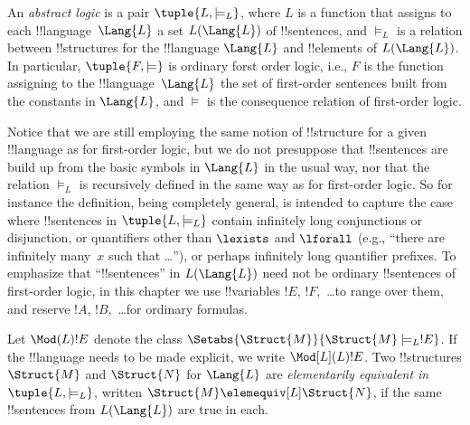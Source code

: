 \documentclass[../../include/open-logic-section]{subfiles}
\begin{document}

\begin{defn}
An \emph{abstract logic} is a pair $\tuple{L, \models_L}$, where $L$ is a
function that assigns to each !!{language}~$\Lang{L}$ a set
$L(\Lang{L})$ of !!{sentence}s, and $\models_L$ is a relation between
!!{structure}s for the !!{language} $\Lang{L}$ and !!{element}s of
$L(\Lang{L})$. In particular, $\tuple{F, \models}$ is ordinary forst
order logic, i.e., $F$ is the function assigning to the
!!{language}~$\Lang{L}$ the set of first-order sentences built from
the constants in $\Lang{L}$, and $\models$ is the consequence relation of
first-order logic.
\end{defn}

Notice that we are still employing the same notion of !!{structure}
for a given !!{language} as for first-order logic, but we do not
presuppose that !!{sentence}s are build up from the basic symbols in
$\Lang{L}$ in the usual way, nor that the relation $\models_L$ is
recursively defined in the same way as for first-order logic. So for
instance the definition, being completely general, is intended to
capture the case where !!{sentence}s in $\tuple{L,\models_L}$ contain
infinitely long conjunctions or disjunction, or quantifiers other than
$\lexists$ and $\lforall$ (e.g., ``there are infinitely many~$x$ such
that \dots''), or perhaps infinitely long quantifier prefixes. To
emphasize that ``!!{sentence}s'' in $L(\Lang{L})$ need not be ordinary
!!{sentence}s of first-order logic, in this chapter we use !!{variable}s $!E$,
$!F$,~\dots to range over them, and reserve $!A$, $!B$,~\dots for
ordinary formulas.

\begin{defn}
Let $\Mod(L){!E}$ denote the class $\Setabs{\Struct{M}}{\Struct{M}
  \models_L !E}$. If the !!{language} needs to be made explicit, we
write $\Mod[L](L){!E}$. Two !!{structure}s $\Struct{M}$ and
$\Struct{N}$ for $\Lang{L}$ are \emph{elementarily equivalent in}
$\tuple{L, \models_L}$, written $\Struct{M} \elemequiv[L] \Struct{N}$, if
the same !!{sentence}s from $L(\Lang{L})$ are true in each.
\end{defn}
\end{document}
